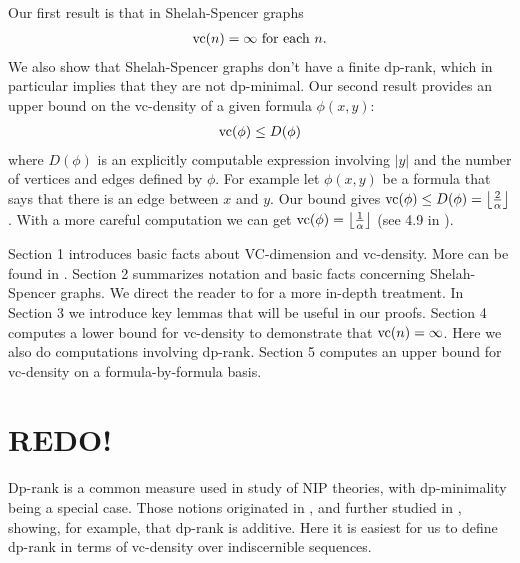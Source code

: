 \documentclass{amsart}
\begin{document}
Our first result is that in Shelah-Spencer graphs
\begin{align*}
  \operatorname{vc}(n) = \infty \text{ for each } n.
\end{align*}
We also show that Shelah-Spencer graphs don't have a finite dp-rank, which in particular implies that they are not dp-minimal.
Our second result provides an upper bound on the vc-density of a given formula $\phi(x, y)$:
\begin{align*}
  \operatorname{vc}(\phi) \leq D(\phi)
\end{align*}
where $D(\phi)$ is an explicitly computable expression involving $|y|$ and the number of vertices and edges defined by $\phi$.
For example let $\phi(x,y)$ be a formula that says that there is an edge between $x$ and $y$.
Our bound gives $\operatorname{vc}(\phi) \leq D(\phi) = \left \lfloor \frac{2}{\alpha} \right \rfloor$.
With a more careful computation we can get $\operatorname{vc}(\phi) = \left \lfloor \frac{1}{\alpha} \right \rfloor$ (see 4.9 in \cite{density}).

Section 1 introduces basic facts about VC-dimension and vc-density.
More can be found in \cite{density}.
Section 2 summarizes notation and basic facts concerning Shelah-Spencer graphs.
We direct the reader to \cite{laskowski} for a more in-depth treatment.
In Section 3 we introduce key lemmas that will be useful in our proofs.
Section 4 computes a lower bound for vc-density to demonstrate that $\operatorname{vc}(n) = \infty$.
Here we also do computations involving dp-rank.
Section 5 computes an upper bound for vc-density on a formula-by-formula basis.



\section{REDO!}

Dp-rank is a common measure used in study of NIP theories, with dp-minimality being a special case.
Those notions originated in \cite{shelah_dp}, and further studied in \cite{dp_add}, showing, for example, that dp-rank is additive.
Here it is easiest for us to define dp-rank in terms of vc-density over indiscernible sequences.
\end{document}

